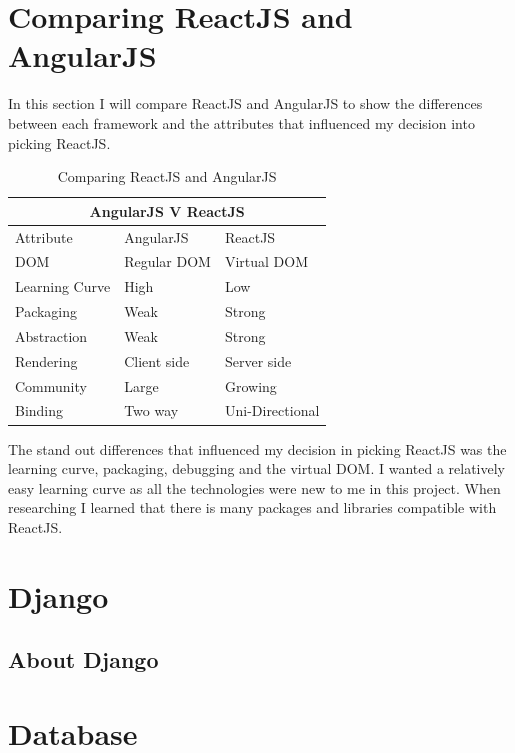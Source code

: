 \section{Comparing ReactJS and AngularJS}
In this section I will compare ReactJS and AngularJS to show the differences between each framework and the attributes that influenced my decision into picking ReactJS. 

\begin{center}
\begin{table}[h]
 \begin{tabular}{ |p{3cm}||p{4cm}|p{4cm}|  }
 \hline
 \multicolumn{3}{|c|}{AngularJS V ReactJS} \\
 \hline
 Attribute & AngularJS & ReactJS \\ [0.7ex] 
 \hline
 DOM & Regular DOM & Virtual DOM  \\
 \hline
 Learning Curve & High & Low  \\
 \hline
 Packaging & Weak & Strong  \\
 \hline
 Abstraction & Weak & Strong \\
 \hline
 Rendering & Client side & Server side \\
 \hline
 Community & Large & Growing \\
 \hline
 Binding & Two way & Uni-Directional  \\ [1ex] 
 \hline
\end{tabular}
\caption{\label{tab:comparing}Comparing ReactJS and AngularJS \cite{kumar2016comparative} }
\end{table}
\end{center}

The stand out differences that influenced my decision in picking ReactJS was the learning curve, packaging, debugging and the virtual DOM. I wanted a relatively easy learning curve as all the technologies were new to me in this project. When researching I learned that there is many packages and libraries compatible with ReactJS.

\section{Django}
\subsection{About Django}

\section{Database}

